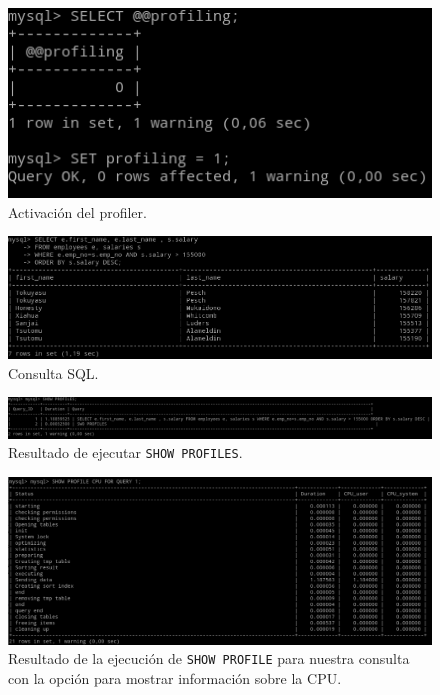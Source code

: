 \begin{figure}[H]
  \begin{center}
    \includegraphics[width=1\textwidth]{imagenes/prof}
    \caption{Activación del profiler.}
    \label{fig25}
  \end{center}
\end{figure}

\begin{figure}[H]
  \begin{center}
    \includegraphics[width=1\textwidth]{imagenes/consulta}
    \caption{Consulta SQL.}
    \label{fig26}
  \end{center}
\end{figure}

\begin{figure}[H]
  \begin{center}
    \includegraphics[width=1\textwidth]{imagenes/profs}
    \caption{Resultado de ejecutar \texttt{SHOW PROFILES}.}
    \label{fig27}
  \end{center}
\end{figure}

\begin{figure}[H]
  \begin{center}
    \includegraphics[width=1\textwidth]{imagenes/mpr}
    \caption{Resultado de la ejecución de \texttt{SHOW PROFILE} para nuestra consulta con la opción para mostrar información sobre la CPU.}
    \label{fig28}
  \end{center}
\end{figure}

